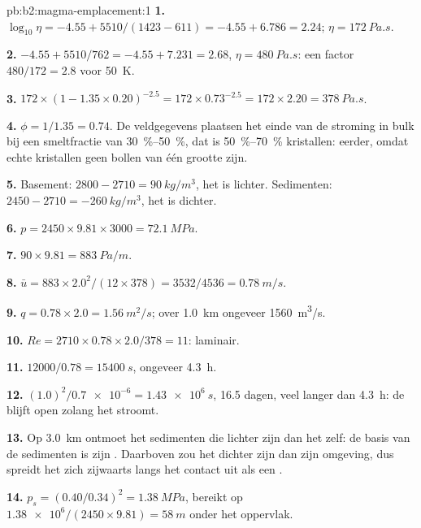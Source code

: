 \begin{solution}{pb:b2:magma-emplacement:1}
\textbf{1.} $\log_{10}\eta = -4.55 + 5510/(1423 - 611) = -4.55 + 6.786 = 2.24$;
$\eta = \qty{172}{Pa.s}$.

\textbf{2.} $-4.55 + 5510/762 = -4.55 + 7.231 = 2.68$, $\eta = \qty{480}{Pa.s}$: een
factor $480/172 = 2.8$ voor \qty{50}{K}.

\textbf{3.} $172\times(1 - 1.35\times0.20)^{-2.5} = 172\times0.73^{-2.5} = 172\times2.20 =
\qty{378}{Pa.s}$.

\textbf{4.} $\phi = 1/1.35 = 0.74$. De veldgegevens plaatsen het einde van de stroming in bulk
bij een smeltfractie van \qtyrange{30}{50}{\percent}, dat is
\qtyrange{50}{70}{\percent} kristallen: eerder, omdat echte kristallen geen
bollen van één grootte zijn.

\textbf{5.} Basement: $2800 - 2710 = \qty{90}{kg/m^3}$, het  is lichter.
Sedimenten: $2450 - 2710 = \qty{-260}{kg/m^3}$, het  is dichter.

\textbf{6.} $p = 2450\times9.81\times3000 = \qty{72.1}{MPa}$.

\textbf{7.} $90\times9.81 = \qty{883}{Pa/m}$.

\textbf{8.} $\bar u = 883\times2.0^2/(12\times378) = 3532/4536 = \qty{0.78}{m/s}$.

\textbf{9.} $q = 0.78\times2.0 = \qty{1.56}{m^2/s}$; over \qty{1.0}{km} ongeveer
\qty{1560}{m^3/s}.

\textbf{10.} $Re = 2710\times0.78\times2.0/378 = 11$: laminair.

\textbf{11.} $12000/0.78 = \qty{15400}{s}$, ongeveer \qty{4.3}{h}.

\textbf{12.} $(1.0)^2/\num{0.7e-6} = \qty{1.43e6}{s}$, 16.5 dagen, veel langer dan
\qty{4.3}{h}: de  blijft open zolang het  stroomt.

\textbf{13.} Op \qty{3.0}{km} ontmoet het  sedimenten die lichter zijn dan het  zelf: de
basis van de sedimenten is zijn . Daarboven zou het 
dichter zijn dan zijn omgeving, dus spreidt het zich zijwaarts langs het contact uit als een
.

\textbf{14.} $p_s = (0.40/0.34)^2 = \qty{1.38}{MPa}$, bereikt op
$\num{1.38e6}/(2450\times9.81) = \qty{58}{m}$ onder het oppervlak.


\end{solution}
